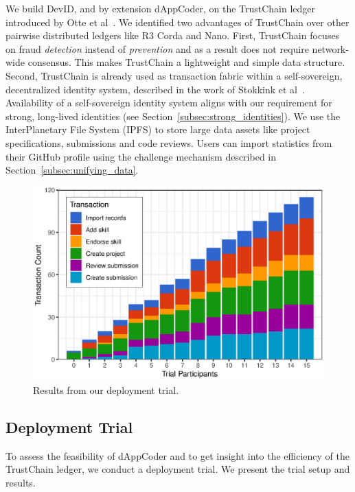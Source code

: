We build DevID, and by extension dAppCoder, on the TrustChain ledger introduced by Otte et al~\cite{otte2017trustchain}.
We identified two advantages of TrustChain over other pairwise distributed ledgers like R3 Corda and Nano.
First, TrustChain focuses on fraud \emph{detection} instead of \emph{prevention} and as a result does not require network-wide consensus.
This makes TrustChain a lightweight and simple data structure.
Second, TrustChain is already used as transaction fabric within a self-sovereign, decentralized identity system, described in the work of Stokkink et al~\cite{stokkink2018deployment}.
Availability of a self-sovereign identity system aligns with our requirement for strong, long-lived identities (see Section~\ref{subsec:strong_identities}).
We use the InterPlanetary File System (IPFS) to store large data assets like project specifications, submissions and code reviews.
Users can import statistics from their GitHub profile using the challenge mechanism described in Section~\ref{subsec:unifying_data}.

\begin{figure}[t!]
	\includegraphics[width=\columnwidth]{devid/resources/experiment/experiment_1_unit.eps}
	\caption{Results from our deployment trial.}
	\label{fig:experiment_graph}
\end{figure}

\subsection{Deployment Trial}
To assess the feasibility of dAppCoder and to get insight into the efficiency of the TrustChain ledger, we conduct a deployment trial.
We present the trial setup and results.

